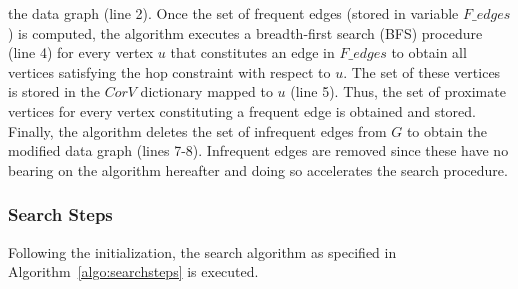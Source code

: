 the data graph (line 2). Once the set of frequent edges (stored in variable
$F\_edges$) is computed, the algorithm executes a breadth-first search (BFS)
procedure (line 4) for every vertex $u$ that constitutes an edge in $F\_edges$
to obtain all vertices satisfying the hop constraint with respect to $u$. The
set of these vertices is stored in the $CorV$ dictionary mapped to $u$ (line 5).
Thus, the set of proximate vertices for every vertex constituting a frequent
edge is obtained and stored. Finally, the algorithm deletes the set of
infrequent edges from $G$ to obtain the modified data graph (lines 7-8).
Infrequent edges are removed since these have no bearing on the algorithm
hereafter and doing so accelerates the search procedure.

\subsubsection{Search Steps}
\label{subsec:search-steps}
Following the initialization, the search algorithm as specified in
Algorithm~\ref{algo:searchsteps} is executed.

